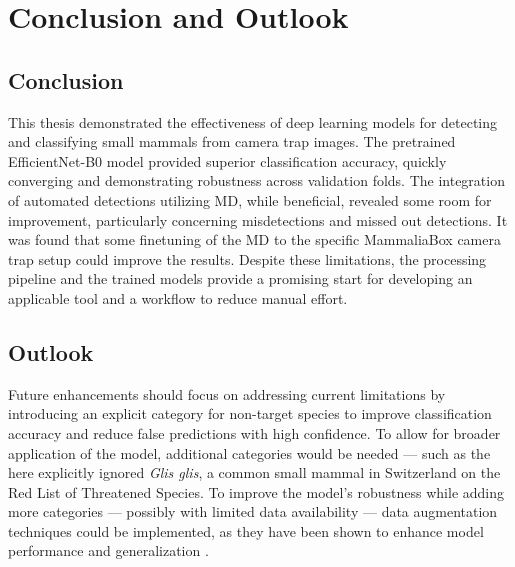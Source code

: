 


\section{Conclusion and Outlook}
\label{conclusion_outlook}

\subsection{Conclusion}

This thesis demonstrated the effectiveness of deep learning models for detecting and classifying small mammals from camera trap images.
The pretrained EfficientNet-B0 model provided superior classification accuracy, quickly converging and demonstrating robustness across validation folds.
The integration of automated detections utilizing \ac{MD}, while beneficial, revealed some room for improvement, particularly concerning misdetections and missed out detections.
It was found that some finetuning of the \ac{MD} to the specific MammaliaBox camera trap setup could improve the results.
Despite these limitations, the processing pipeline and the trained models provide a promising start for developing an applicable tool and a workflow to reduce manual effort.

\subsection{Outlook}
Future enhancements should focus on addressing current limitations by introducing an explicit category for non-target species to improve classification accuracy and reduce false predictions with high confidence.
To allow for broader application of the model, additional categories would be needed --- such as the here explicitly ignored \textit{Glis glis}, a common small mammal in Switzerland on the \textcite{iucnIUCNRedList2025} Red List of Threatened Species.
To improve the model's robustness while adding more categories --- possibly with limited data availability --- data augmentation techniques could be implemented, as they have been shown to enhance model performance and generalization \autocite{shortenSurveyImageData2019}.

